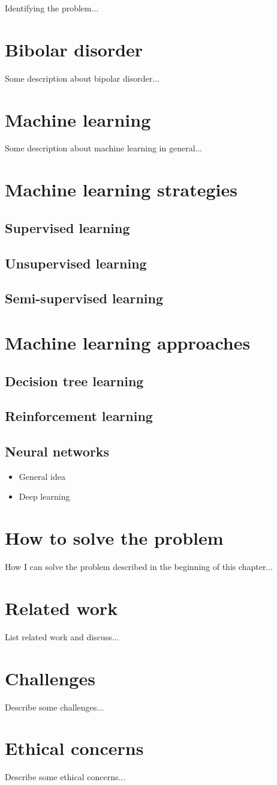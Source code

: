 Identifying the problem...

\section{Bibolar disorder}
Some description about bipolar disorder...

\section{Machine learning}
Some description about machine learning in general...

\section{Machine learning strategies}
\subsection{Supervised learning}
\subsection{Unsupervised learning}
\subsection{Semi-supervised learning}

\section{Machine learning approaches}
\subsection{Decision tree learning}
\subsection{Reinforcement learning}
\subsection{Neural networks}
\begin{itemize}
    \item General idea
    \item Deep learning
\end{itemize}


\section{How to solve the problem}
How I can solve the problem described in the beginning of this chapter...

\section{Related work}
List related work and discuss...

\section{Challenges}
Describe some challenges...

\section{Ethical concerns}
Describe some ethical concerns...
